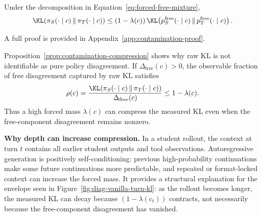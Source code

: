 \begin{proposition}
\label{prop:contamination-compression}
Under the decomposition in Equation~\ref{eq:forced-free-mixture},
\begin{equation}
\KL\!\left(\pi_S(\cdot\mid c)\,\|\,\pi_T(\cdot\mid c)\right)
\le
(1-\lambda(c))\,
\KL\!\left(
p_S^{\mathrm{free}}(\cdot\mid c)\,\|\,
p_T^{\mathrm{free}}(\cdot\mid c)
\right).
\label{eq:contamination-bound}
\end{equation}
\end{proposition}

A full proof is provided in
Appendix~\ref{app:contamination-proof}.


Proposition~\ref{prop:contamination-compression} shows why raw KL is not
identifiable as pure policy disagreement. If
$\Delta_{\mathrm{free}}(c)>0$, the observable fraction of free disagreement
captured by raw KL satisfies
\begin{equation}
\rho(c)
  =
  \frac{
  \KL\!\left(\pi_S(\cdot\mid c)\,\|\,\pi_T(\cdot\mid c)\right)}
  {\Delta_{\mathrm{free}}(c)}
  \le 1-\lambda(c).
\label{eq:compression-ratio}
\end{equation}
Thus a high forced mass $\lambda(c)$ can compress the measured KL even when the
free-component disagreement remains nonzero.

\textbf{Why depth can increase compression.}
In a student rollout, the context at turn $t$ contains all earlier student
outputs and tool observations. Autoregressive generation is positively
self-conditioning: previous high-probability continuations make some future
continuations more predictable, and repeated or format-locked context can
increase the forced mass. It provides a structural explanation for the envelope
seen in Figure~\ref{fig:diag-vanilla-turn-kl}: as the rollout becomes longer,
the measured KL can decay because $(1-\lambda(c_t))$ contracts, not necessarily
because the free-component disagreement has vanished.

